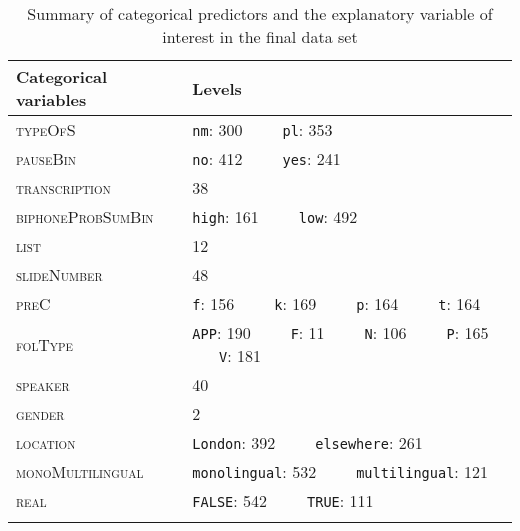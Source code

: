 \begin{table}[H]\fontsize{10}{11}
\caption{Summary of categorical predictors and the explanatory variable of interest in the final data set}
\label{tab:5.3}
\centering
\begin{tabular}{ll}
\lsptoprule
Categorical variables & Levels                                                   \\
\midrule
\textsc{typeOfS}               & \texttt{nm}: 300~ ~ ~ \texttt{pl}: 353                                     \\
\textsc{pauseBin}              & \texttt{no}: 412~ ~ ~ \texttt{yes}: 241                                    \\
\textsc{transcription}         & 38                                                       \\
\textsc{biphoneProbSumBin}     & \texttt{high}: 161~ ~ ~ \texttt{low}: 492                                  \\
\textsc{list}                  & 12                                                       \\
\textsc{slideNumber}           & 48                                                       \\
\textsc{preC}                  & \texttt{f}: 156~ ~ ~ \texttt{k}: 169~ ~ ~ \texttt{p}: 164~ ~ ~ \texttt{t}: 164               \\
\textsc{folType}               & \texttt{APP}: 190~ ~ ~ \texttt{F}: 11~ ~ ~ \texttt{N}: 106~ ~ ~ \texttt{P}: 165~ ~ ~ \texttt{V}: 181  \\
\textsc{speaker}               & 40                                                       \\
\textsc{gender}                & 2                                                        \\
\textsc{location}              & \texttt{London}: 392~ ~ ~ \texttt{elsewhere}: 261                          \\
\textsc{monoMultilingual}      & \texttt{monolingual}: 532~ ~ ~ \texttt{multilingual}: 121                  \\
\textsc{real}                  & \texttt{FALSE}: 542~ ~ ~ \texttt{TRUE}: 111                               \\
\lspbottomrule
\end{tabular}
\end{table}







